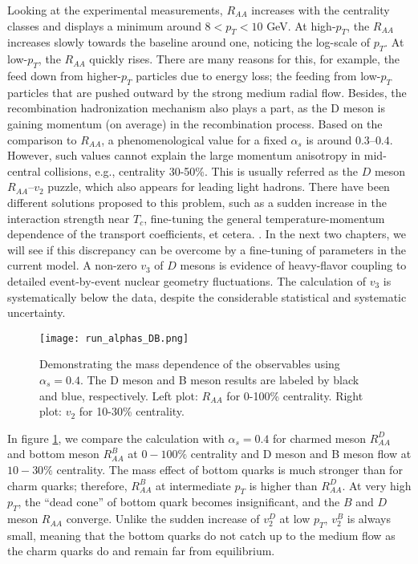 Looking at the experimental measurements, $R_{AA}$ increases with the centrality classes and displays a minimum around $8 < p_T < 10$ GeV.
At high-$p_T$, the $R_{AA}$ increases slowly towards the baseline around one, noticing the log-scale of $p_T$.
At low-$p_T$, the $R_{AA}$ quickly rises.
There are many reasons for this, for example, the feed down from higher-$p_T$ particles due to energy loss;  the feeding from low-$p_T$ particles that are pushed outward by the strong medium radial flow.
Besides, the recombination hadronization mechanism also plays a part, as the D meson is gaining momentum (on average) in the recombination process.
Based on the comparison to $R_{AA}$, a phenomenological value for a fixed $\alpha_s$ is around $0.3$--$0.4$.
However, such values cannot explain the large momentum anisotropy in mid-central collisions, e.g., centrality 30-50\%.
This is usually referred as the $D$ meson $R_{AA}$--$v_2$ puzzle, which also appears for leading light hadrons.
There have been different solutions proposed to this problem, such as a sudden increase in the interaction strength near $T_c$, fine-tuning the general temperature-momentum dependence of the transport coefficients, et cetera. \cite{SCARDINA2016329,Xu:2017obm,Shi:2018vys}.
In the next two chapters, we will see if this discrepancy can be overcome by a fine-tuning of parameters in the current model.
A non-zero $v_3$ of $D$ mesons is evidence of heavy-flavor coupling to detailed event-by-event nuclear geometry fluctuations.
The calculation of $v_3$ is systematically below the data, despite the considerable statistical and systematic uncertainty.

\begin{figure}
\singlespacing
\centering
\texttt{[image: run\_alphas\_DB.png]}
\caption[Demonstrating the mass dependence of the observables using]{Demonstrating the mass dependence of the observables using $\alpha_s = 0.4$. 
The D meson and B meson results are labeled by black and blue, respectively.
Left plot: $R_{AA}$ for 0-100\% centrality. Right plot: $v_2$ for 10-30\% centrality.}
\label{fig:new:charm-bottom}
\end{figure}

In figure \ref{fig:new:charm-bottom}, we compare the calculation with $\alpha_s = 0.4$ for charmed meson $R_{AA}^D$ and bottom meson $R_{AA}^B$ at $0-100\%$ centrality and D meson and B meson flow at $10-30\%$ centrality.
The mass effect of bottom quarks is much stronger than for charm quarks; therefore, $R_{AA}^B$ at intermediate $p_T$ is higher than $R_{AA}^D$. 
At very high $p_T$, the ``dead cone'' of bottom quark becomes insignificant, and the $B$ and $D$ meson $R_{AA}$ converge.
Unlike the sudden increase of $v_2^D$ at low $p_T$, $v_2^B$ is always small, meaning that the bottom quarks do not catch up to the medium flow as the charm quarks do and remain far from equilibrium.

